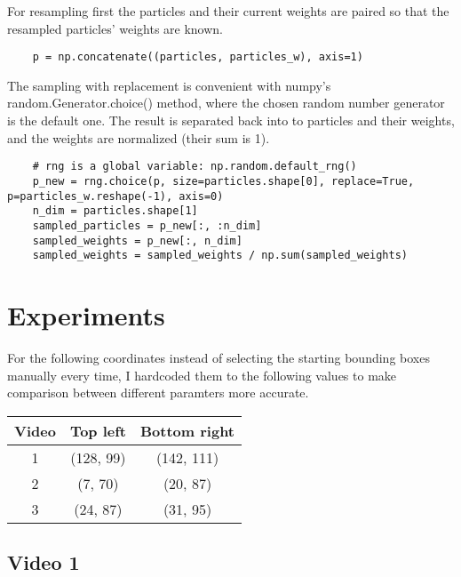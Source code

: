 \documentclass[10pt,a4paper,twoside]{article}
\begin{document}
For resampling first the particles and their current weights are paired so that
the resampled particles' weights are known.
\begin{verbatim}
    p = np.concatenate((particles, particles_w), axis=1)
\end{verbatim}
The sampling with replacement is convenient with numpy's random.Generator.choice() method, where the
chosen random number generator is the default one. The result is separated back into to particles
and their weights, and the weights are normalized (their sum is 1).
\begin{verbatim}
    # rng is a global variable: np.random.default_rng()
    p_new = rng.choice(p, size=particles.shape[0], replace=True, p=particles_w.reshape(-1), axis=0)
    n_dim = particles.shape[1]
    sampled_particles = p_new[:, :n_dim]
    sampled_weights = p_new[:, n_dim]
    sampled_weights = sampled_weights / np.sum(sampled_weights)
\end{verbatim}

\section{Experiments}

For the following coordinates instead of selecting the starting bounding boxes
manually every time, I hardcoded them to the following values to make comparison
between different paramters more accurate.
\begin{table}[h!]
\begin{center}
    \begin{tabular}{ c c c } 
     \hline
     Video & Top left & Bottom right\\
     \hline
     \hline
     1 & (128, 99)& (142, 111)\\ 
     \hline
     2 & (7, 70)&(20, 87)\\
     \hline
     3 & (24, 87)&(31, 95)\\
     \hline
    \end{tabular}
\end{center}
\end{table}    

\subsection{Video 1}
\end{document}
